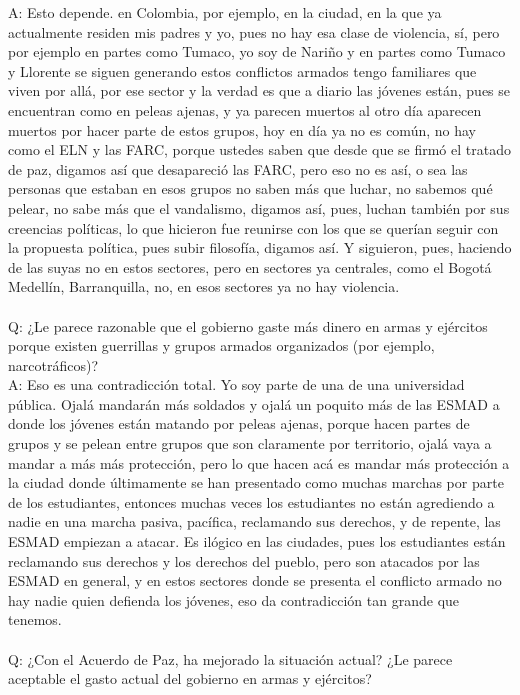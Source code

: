 \documentclass{phyasgn}\usepackage{nag}
\begin{document}
A: Esto depende. en Colombia, por ejemplo, en la ciudad, en la que ya actualmente residen mis padres y yo, pues no hay esa clase de violencia, sí, pero por ejemplo en partes como Tumaco, yo soy de Nariño y en partes como Tumaco y Llorente se siguen generando estos conflictos armados tengo familiares que viven por allá, por ese sector y la verdad es que a diario las jóvenes están, pues se encuentran como en peleas ajenas, y ya parecen muertos al otro día aparecen muertos por hacer parte de estos grupos, hoy en día ya no es común, no hay como el ELN y las FARC, porque ustedes saben que desde que se firmó el tratado de paz, digamos así que desapareció las FARC, pero eso no es así, o sea las personas que estaban en esos grupos no saben más que luchar, no sabemos qué pelear, no sabe más que el vandalismo, digamos así, pues, luchan también por sus creencias políticas, lo que hicieron fue reunirse con los que se querían seguir con la propuesta política, pues subir filosofía, digamos así. Y siguieron, pues, haciendo de las suyas no en estos sectores, pero en sectores ya centrales, como el Bogotá Medellín, Barranquilla, no, en esos sectores ya no hay violencia. \\
\\
Q: ¿Le parece razonable que el gobierno gaste más dinero en armas y ejércitos porque existen guerrillas y grupos armados organizados (por ejemplo, narcotráficos)?\\
A: Eso es una contradicción total. Yo soy parte de una de una universidad pública. Ojalá mandarán más soldados y ojalá un poquito más de las ESMAD a donde los jóvenes están matando por peleas ajenas, porque hacen partes de grupos y se pelean entre grupos que son claramente por territorio, ojalá vaya a mandar a más más protección, pero lo que hacen acá es mandar más protección a la ciudad donde últimamente se han presentado como muchas marchas por parte de los estudiantes, entonces muchas veces los estudiantes no están agrediendo a nadie en una marcha pasiva, pacífica, reclamando sus derechos, y de repente, las ESMAD empiezan a atacar. Es ilógico en las ciudades, pues los estudiantes están reclamando sus derechos y los derechos del pueblo, pero son atacados por las ESMAD en general, y en estos sectores donde se presenta el conflicto armado no hay nadie quien defienda los jóvenes, eso da contradicción tan grande que tenemos.\\
\\
Q: ¿Con el Acuerdo de Paz, ha mejorado la situación actual? ¿Le parece aceptable el gasto actual del gobierno en armas y ejércitos?\\
\end{document}
